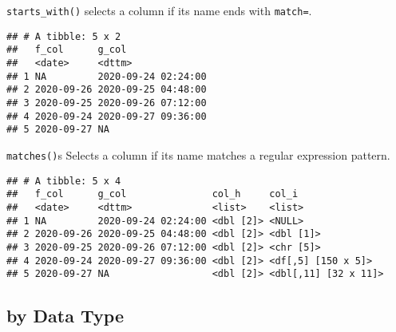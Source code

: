 \documentclass[
]{book}
\newenvironment{Shaded}{\begin{snugshade}}{\end{snugshade}}
\newcommand{\CharTok}[1]{\textcolor[rgb]{0.31,0.60,0.02}{#1}}
\newcommand{\KeywordTok}[1]{\textcolor[rgb]{0.13,0.29,0.53}{\textbf{#1}}}
\newcommand{\NormalTok}[1]{#1}
\newcommand{\OperatorTok}[1]{\textcolor[rgb]{0.81,0.36,0.00}{\textbf{#1}}}
\newcommand{\StringTok}[1]{\textcolor[rgb]{0.31,0.60,0.02}{#1}}
\begin{document}
\texttt{starts\_with()} selects a column if its name ends with \texttt{match=}.

\begin{Shaded}
\end{Shaded}

\begin{verbatim}
## # A tibble: 5 x 2
##   f_col      g_col              
##   <date>     <dttm>             
## 1 NA         2020-09-24 02:24:00
## 2 2020-09-26 2020-09-25 04:48:00
## 3 2020-09-25 2020-09-26 07:12:00
## 4 2020-09-24 2020-09-27 09:36:00
## 5 2020-09-27 NA
\end{verbatim}

\texttt{matches()}s Selects a column if its name matches a regular expression pattern.

\begin{Shaded}
\end{Shaded}

\begin{verbatim}
## # A tibble: 5 x 4
##   f_col      g_col               col_h     col_i               
##   <date>     <dttm>              <list>    <list>              
## 1 NA         2020-09-24 02:24:00 <dbl [2]> <NULL>              
## 2 2020-09-26 2020-09-25 04:48:00 <dbl [2]> <dbl [1]>           
## 3 2020-09-25 2020-09-26 07:12:00 <dbl [2]> <chr [5]>           
## 4 2020-09-24 2020-09-27 09:36:00 <dbl [2]> <df[,5] [150 x 5]>  
## 5 2020-09-27 NA                  <dbl [2]> <dbl[,11] [32 x 11]>
\end{verbatim}

\hypertarget{by-data-type}{%
\subsection{by Data Type}\label{by-data-type}}

\begin{Shaded}
\end{Shaded}
\end{document}
